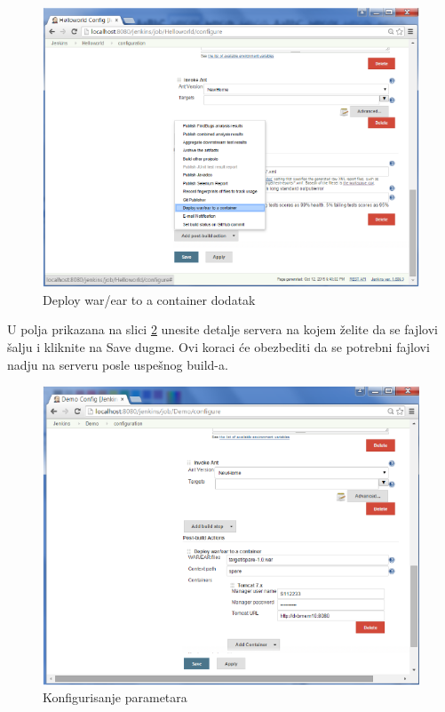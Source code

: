 \begin{figure}
\begin{center}
\includegraphics[scale=0.45]{slike/deploy_war_ear_container.png}
\end{center}
\caption{Deploy war/ear to a container dodatak}
\label{fig:deploy_war_ear_container}
\end{figure}

U polja prikazana na slici \ref{fig:demo_config.png} unesite detalje servera na kojem želite da se fajlovi šalju i kliknite na Save dugme. Ovi koraci će obezbediti da se potrebni fajlovi nadju na serveru posle uspešnog build-a.

\begin{figure}
\begin{center}
\includegraphics[scale=0.45]{slike/demo_config.png}
\end{center}
\caption{Konfigurisanje parametara}
\label{fig:demo_config.png}
\end{figure}


